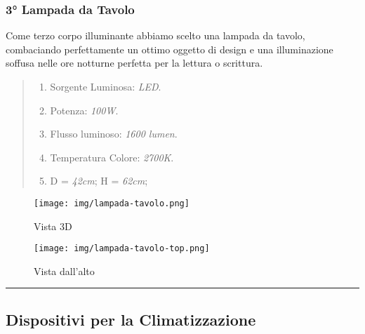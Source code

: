 \documentclass[italian, 12pt, a4paper]{article}
\begin{document}
\subsubsection{3° Lampada da Tavolo}
Come terzo corpo illuminante abbiamo scelto una lampada da tavolo, combaciando perfettamente un ottimo oggetto di design e una illuminazione soffusa nelle ore notturne perfetta per la lettura o scrittura.
\begin{quote}
    \begin{enumerate}
        \item Sorgente Luminosa: \emph{LED}.
        \item Potenza: \emph{100W}.
        \item Flusso luminoso: \emph{1600 lumen}.
        \item Temperatura Colore: \emph{2700K}.
        \item D = \emph{42cm}; H = \emph{62cm};
    \end{enumerate}
\end{quote}
\begin{figure}[h]
    \centering
    \begin{minipage}{0.45\textwidth}
        \centering
        \texttt{[image: img/lampada-tavolo.png]} %
        \caption{Vista 3D}
    \end{minipage} \hfill
    \begin{minipage}{0.45\textwidth}
        \centering
        \texttt{[image: img/lampada-tavolo-top.png]} %
        \caption{Vista dall'alto}
    \end{minipage}
\end{figure}
\hrule
\clearpage
\subsection{Dispositivi per la Climatizzazione}
\end{document}

